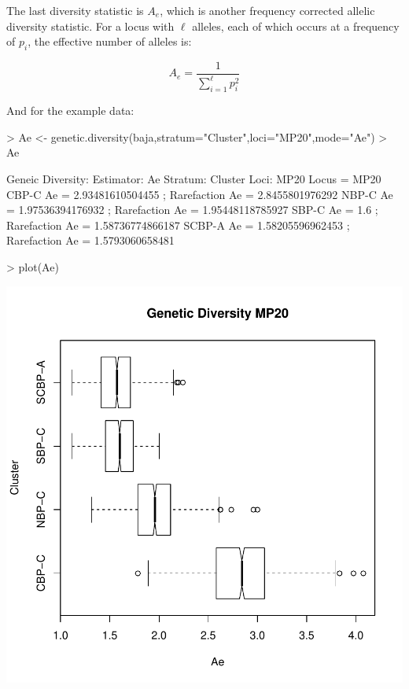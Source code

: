 \documentclass[letterpaper,twoside,openany]{book}
\begin{document}
The last diversity statistic is $A_e$, which is another frequency corrected allelic diversity statistic.  For a locus with $\ell$ alleles, each of which occurs at a frequency of $p_i$, the effective number of alleles is:

\begin{equation}
	A_e = \frac{1}{\sum_{i=1}^\ell p_i^2}
\end{equation}

And for the example data:

\begin{Schunk}
\begin{Sinput}
> Ae <- genetic.diversity(baja,stratum="Cluster",loci="MP20",mode="Ae")
> Ae
\end{Sinput}
\begin{Soutput}
Geneic Diversity:
  Estimator: Ae 
  Stratum: Cluster 
  Loci: { MP20 }
  Locus = MP20 
    CBP-C Ae = 2.93481610504455 ; Rarefaction Ae = 2.8455801976292 
    NBP-C Ae = 1.97536394176932 ; Rarefaction Ae = 1.95448118785927 
    SBP-C Ae = 1.6 ; Rarefaction Ae = 1.58736774866187 
    SCBP-A Ae = 1.58205596962453 ; Rarefaction Ae = 1.5793060658481 
\end{Soutput}
\begin{Sinput}
> plot(Ae)
\end{Sinput}
\end{Schunk}
\includegraphics{gstudio-025}
\end{document}
